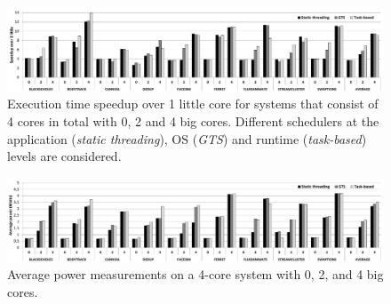 \begin{figure}[t]%
	\centering
	\includegraphics[width=1.0\textwidth]{figures/speedup-4.pdf}
	\vspace{-0.5cm}
	\caption{Execution time speedup over 1 little core for systems that consist of 4 cores in 
total with 0, 2 and 4 big cores. Different schedulers at the application (\textit{static 
threading}), OS  (\textit{GTS}) and runtime (\textit{task-based}) levels are considered.}
	\label{fig:speedup4}%
	\vspace{-0.3cm}
\end{figure}



\begin{figure}[t]%
	\centering
	\includegraphics[width=1.0\textwidth]{figures/power4.pdf}
	\vspace{-0.5cm}
	\caption{Average power measurements on a 4-core system with 0, 2, and 4 big cores.}
	\label{fig:power4}%
	\vspace{-0.3cm}
\end{figure}

